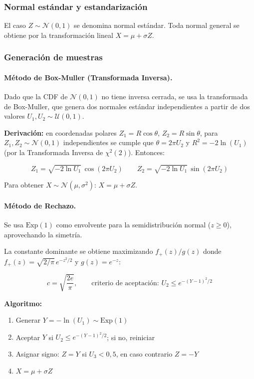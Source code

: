 \subsubsection{Normal estándar y estandarización}

El caso $Z \sim \mathcal{N}(0, 1)$ se denomina normal estándar. Toda normal general se
obtiene por la transformación lineal $X = \mu + \sigma Z$.

\subsubsection{Generación de muestras}

\paragraph{Método de Box-Muller (Transformada Inversa).}
Dado que la CDF de $\mathcal{N}(0,1)$ no tiene inversa cerrada, se usa la transformada de
Box-Muller, que genera dos normales estándar independientes a partir de dos valores
$U_1, U_2 \sim \mathcal{U}(0,1)$.

\textbf{Derivación:} en coordenadas polares $Z_1 = R\cos\theta$, $Z_2 = R\sin\theta$, para
$Z_1, Z_2 \sim \mathcal{N}(0,1)$ independientes se cumple que $\theta = 2\pi U_2$ y
$R^2 = -2\ln(U_1)$ (por la Transformada Inversa de $\chi^2(2)$). Entonces:

\begin{equation}
\boxed{Z_1 = \sqrt{-2\ln U_1}\,\cos(2\pi U_2)} \qquad
\boxed{Z_2 = \sqrt{-2\ln U_1}\,\sin(2\pi U_2)}
\end{equation}

Para obtener $X \sim \mathcal{N}(\mu, \sigma^2)$: $X = \mu + \sigma Z$.

\paragraph{Método de Rechazo.}
Se usa $\text{Exp}(1)$ como envolvente para la semidistribución normal ($z \geq 0$),
aprovechando la simetría.

La constante dominante se obtiene maximizando $f_+(z)/g(z)$ donde
$f_+(z) = \sqrt{2/\pi}\,e^{-z^2/2}$ y $g(z) = e^{-z}$:

\begin{equation}
c = \sqrt{\frac{2e}{\pi}}, \qquad
\text{criterio de aceptación: } U_2 \leq e^{-(Y-1)^2/2}
\end{equation}

\textbf{Algoritmo:}
\begin{enumerate}
    \item Generar $Y = -\ln(U_1) \sim \text{Exp}(1)$
    \item Aceptar $Y$ si $U_2 \leq e^{-(Y-1)^2/2}$; si no, reiniciar
    \item Asignar signo: $Z = Y$ si $U_3 < 0{,}5$, en caso contrario $Z = -Y$
    \item $X = \mu + \sigma Z$
\end{enumerate}

